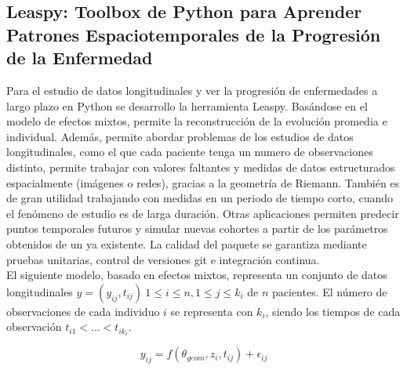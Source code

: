 	\subsection{Leaspy: Toolbox de Python para Aprender Patrones Espaciotemporales de la Progresión de la Enfermedad}
	
	Para el estudio de datos longitudinales y ver la progresión de enfermedades a largo plazo en Python se desarrollo la herramienta Leaspy. Basándose en el modelo de efectos mixtos, permite la reconstrucción de la evolución promedia e individual. Además, permite abordar problemas de los estudios de datos longitudinales, como el que cada paciente tenga un numero de observaciones distinto, permite trabajar con valores faltantes y medidas de datos estructurados espacialmente (imágenes o redes), gracias a la geometría de Riemann. También es de gran utilidad trabajando con medidas en un periodo de tiempo corto, cuando el fenómeno de estudio es de larga duración. Otras aplicaciones permiten predecir puntos temporales futuros y simular nuevas cohortes a partir de los parámetros obtenidos de un ya existente. La calidad del paquete se garantiza mediante pruebas unitarias, control de versiones git e integración continua.\\
	
	El siguiente modelo, basado en efectos mixtos, representa un conjunto de datos longitudinales $y=(y_{ij},t_{ij})\ 1 \leq i \le n, 1 \le j \le k_{i}$ de $\textit{n}$ pacientes. El número de observaciones de cada individuo $i$ se representa con $k_{i}$, siendo los tiempos de cada observación $t_{i1} < ... < t_{ik_{i}}$.
	
	\begin{equation}
		y_{ij} = f(\theta_{geom}, z_{i}, t_{ij} ) + \epsilon_{ij}
	\end{equation}
	
